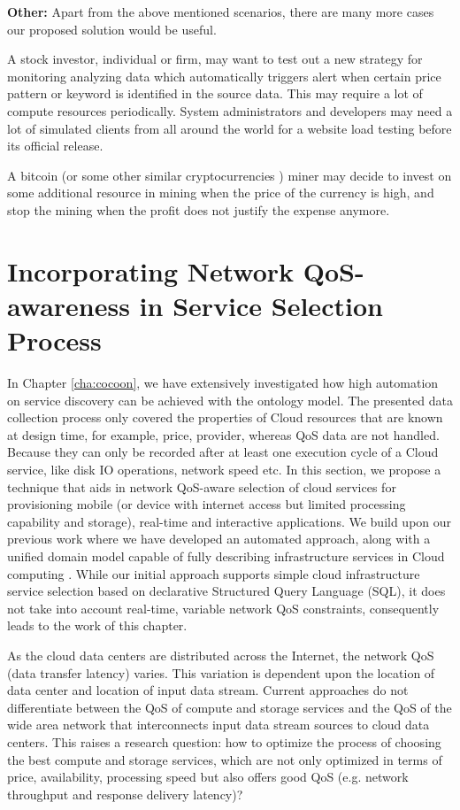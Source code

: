 \textbf{Other:} Apart from the above mentioned scenarios, there are many more cases our proposed solution would be useful.

A stock investor, individual or firm, may want to test out a new strategy for monitoring analyzing data which automatically triggers alert when certain price pattern or keyword is identified in the source data. This may require a lot of compute resources periodically.
System administrators and developers may need a lot of simulated clients from all around the world for a website load testing before its official release.

A bitcoin    \cite{bedford2013bitcoin} (or some other similar cryptocurrencies \cite{ref17}) miner may decide to invest on some additional resource in mining when the price of the currency is high, and stop the mining when the profit does not justify the expense anymore.

\section{Incorporating Network QoS-awareness in Service Selection Process}
In Chapter \ref{cha:cocoon}, we have extensively investigated
how high automation on service discovery can be achieved with the ontology model.
The presented data collection process only covered the properties of Cloud
resources that are known at design time, for example,
price, provider, whereas QoS data are not handled.
Because they can only be recorded after at least one execution
cycle of a Cloud service, like disk IO operations,
network speed etc.
In this section, we propose a technique that aids in network QoS-aware selection of cloud services for provisioning mobile (or device with internet access but limited processing capability and storage), real-time and interactive applications. We build upon our previous work where we have developed an automated approach, along with a unified domain model capable of fully describing infrastructure services in Cloud computing  \cite{CoCoOn2012,GECON2012}. While our initial approach supports simple cloud infrastructure service selection based on declarative Structured Query Language (SQL), it does not take into account real-time, variable network QoS constraints, consequently leads to the work of this chapter.

As the cloud data centers are distributed across the Internet, the network QoS (data transfer latency) varies. This variation is dependent upon the location of data center and location of input data stream. Current approaches do not differentiate between the QoS of compute and storage services and the QoS of the wide area network that interconnects input data stream sources to cloud data centers. This raises a research question: how to optimize the process of choosing the best compute and storage services, which are not only optimized in terms of price, availability, processing speed but also offers good QoS (e.g. network throughput and response delivery latency)?

